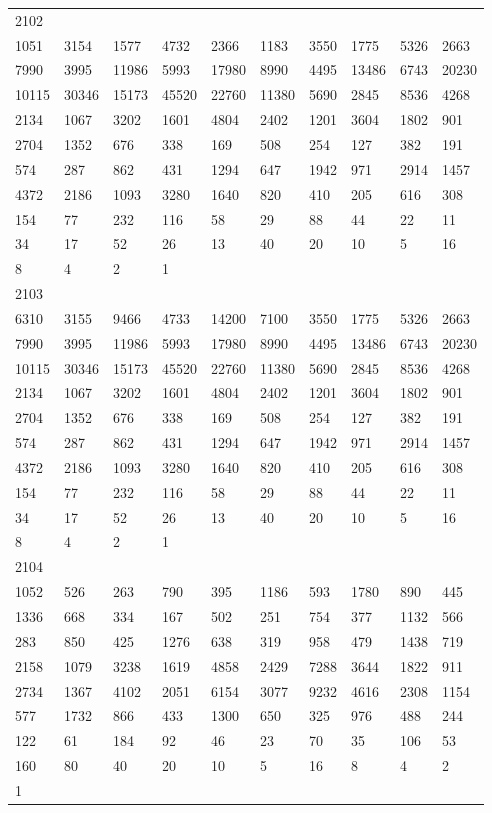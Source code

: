 \begin{longtable}{*{10}{l}}
2102&&&&&&&&&\\
1051& 3154& 1577& 4732& 2366& 1183& 3550& 1775& 5326& 2663\\
7990& 3995& 11986& 5993& 17980& 8990& 4495& 13486& 6743& 20230\\
10115& 30346& 15173& 45520& 22760& 11380& 5690& 2845& 8536& 4268\\
2134& 1067& 3202& 1601& 4804& 2402& 1201& 3604& 1802& 901\\
2704& 1352& 676& 338& 169& 508& 254& 127& 382& 191\\
574& 287& 862& 431& 1294& 647& 1942& 971& 2914& 1457\\
4372& 2186& 1093& 3280& 1640& 820& 410& 205& 616& 308\\
154& 77& 232& 116& 58& 29& 88& 44& 22& 11\\
34& 17& 52& 26& 13& 40& 20& 10& 5& 16\\
8& 4& 2& 1& \\

2103&&&&&&&&&\\
6310& 3155& 9466& 4733& 14200& 7100& 3550& 1775& 5326& 2663\\
7990& 3995& 11986& 5993& 17980& 8990& 4495& 13486& 6743& 20230\\
10115& 30346& 15173& 45520& 22760& 11380& 5690& 2845& 8536& 4268\\
2134& 1067& 3202& 1601& 4804& 2402& 1201& 3604& 1802& 901\\
2704& 1352& 676& 338& 169& 508& 254& 127& 382& 191\\
574& 287& 862& 431& 1294& 647& 1942& 971& 2914& 1457\\
4372& 2186& 1093& 3280& 1640& 820& 410& 205& 616& 308\\
154& 77& 232& 116& 58& 29& 88& 44& 22& 11\\
34& 17& 52& 26& 13& 40& 20& 10& 5& 16\\
8& 4& 2& 1& \\

2104&&&&&&&&&\\
1052& 526& 263& 790& 395& 1186& 593& 1780& 890& 445\\
1336& 668& 334& 167& 502& 251& 754& 377& 1132& 566\\
283& 850& 425& 1276& 638& 319& 958& 479& 1438& 719\\
2158& 1079& 3238& 1619& 4858& 2429& 7288& 3644& 1822& 911\\
2734& 1367& 4102& 2051& 6154& 3077& 9232& 4616& 2308& 1154\\
577& 1732& 866& 433& 1300& 650& 325& 976& 488& 244\\
122& 61& 184& 92& 46& 23& 70& 35& 106& 53\\
160& 80& 40& 20& 10& 5& 16& 8& 4& 2\\
1& \\


\end{longtable}

